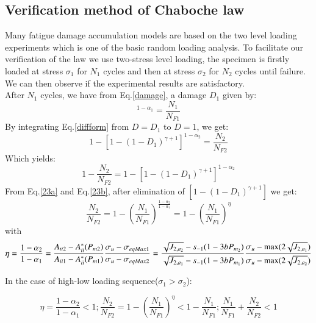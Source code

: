 \documentclass[3p,times,procedia,number]{elsarticle}
\begin{document}
\clearpage
\subsection{Verification method of Chaboche law}

Many fatigue damage accumulation models are based on the two level loading experiments which is one of the basic random loading analysis. To facilitate our verification of the law we use two-stress level loading, the specimen is firstly loaded at stress $\sigma_1$ for $N_1$ cycles and then at stress $\sigma_2$ for $N_2$ cycles until failure. We can then observe if the experimental results are satisfactory.\\
After $N_1$ cycles, we have from Eq.\eqref{damage}, a damage $D_1$ given by:
\begin{equation}
[1-(1-D_1)^{\gamma+1}]^{1-\alpha_1}=\frac{N_1}{N_{F1}}
\label{23a}
\end{equation}
By integrating Eq.\eqref{diffform} from $D=D_1$ to $D=1$, we get:
\begin{equation}
1-[1-(1-D_1)^{\gamma+1}]^{1-\alpha_2}=\frac{N_2}{N_{F2}}
\end{equation}
Which yields:
\begin{equation}1-\frac{N_2}{N_{F2}}=1-[1-(1-D_1)^{\gamma+1}]^{1-\alpha_2}
\label{23b}
\end{equation}
From Eq.\eqref{23a} and Eq.\eqref{23b}, after elimination of $[1-(1-D_1)^{\gamma+1}]$ we get:
\begin{equation} \frac{N_2}{N_{F2}}=1-(\frac{N_1}{N_{F1}})^\frac{1-\alpha_2}{1-\alpha_1}=1-(\frac{N_1}{N_{F1}})^\eta\end{equation}
with
\begin{equation}\eta=\frac{1-\alpha_2}{1-\alpha_1}=
\frac{A_{\uppercase\expandafter{\romannumeral2 2}} - A_{\uppercase\expandafter{\romannumeral2}}^\ast(P_{m2})}{A_{\uppercase\expandafter{\romannumeral2 1}} - A_{\uppercase\expandafter{\romannumeral2}}^\ast(P_{m1})}\frac{ \sigma_{u} - \sigma_{eqMax1}}{ \sigma_{u} - \sigma_{eqMax2}}=
\frac{\sqrt{J_{2,a_2}} - s_{-1}(1-3bP_{m_2})}{\sqrt{J_{2,a_1}} - s_{-1}(1-3bP_{m_1})}\frac{ \sigma_{u} - \max(2\sqrt{J_{2,a_1}})}{  \sigma_{u} - \max(2\sqrt{J_{2,a_2}})}
\label{eq.eta}
\end{equation}

In the case of high-low loading sequence($\sigma_1>\sigma_2$):

$$\eta=\frac{1-\alpha_2}{1-\alpha_1}<1;\frac{N_2}{N_{F2}}=1-(\frac{N_1}{N_{F1}})^\eta<1-\frac{N_1}{N_{F1}};\frac{N_1}{N_{F1}}+\frac{N_2}{N_{F2}}<1$$
\end{document}
